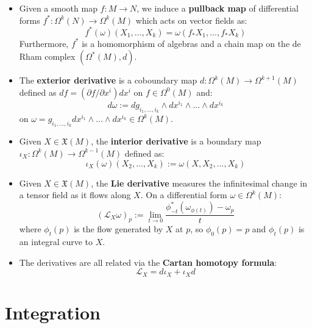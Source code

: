 \documentclass[11pt, oneside]{article}   	%
\theoremstyle{definition}
\begin{document}
\begin{itemize}
	\item Given a smooth map $f : M\rightarrow N$, we induce a \textbf{pullback map} of differential forms $f^* : \Omega^k(N)
	\rightarrow\Omega^k(M)$ which acts on vector fields as:
	\begin{equation}
		f^*(\omega)(X_1, ..., X_k) = \omega(f_* X_1, ..., f_* X_k)
	\end{equation}
	Furthermore, $f^*$ is a homomorphism of algebras and a chain map on the de Rham complex $(\Omega^*(M), d)$. 
	
	\item The \textbf{exterior derivative} is a coboundary map $d : \Omega^k(M)\rightarrow\Omega^{k + 1}(M)$ defined as 
	$df = (\partial f / \partial x^i)dx^i$ on $f\in\Omega^0(M)$ and:
	\begin{equation}
		d\omega := dg_{i_1, ..., i_k}\wedge dx^{i_1}\wedge ...\wedge 
		dx^{i_k}
	\end{equation}
	on $\omega = g_{i_1, ..., i_k} dx^{i_1}\wedge...\wedge dx^{i_k}\in\Omega^k(M)$. 
	
	\item Given $X\in\mathfrak X(M)$, the \textbf{interior derivative} is a boundary map $\iota_X : \Omega^k(M)
	\rightarrow\Omega^{k - 1}(M)$ defined as:
	\begin{equation}
		\iota_X(\omega)(X_2, ..., X_k) := \omega(X, X_2, ..., X_k)
	\end{equation}
	
	\item Given $X\in\mathfrak X(M)$, the \textbf{Lie derivative} measures the infinitesimal change in a tensor field as it 
	flows along $X$. On a differential form $\omega\in\Omega^k(M)$:
	\begin{equation}
		(\mathcal L_X\omega)_p := \lim_{t\rightarrow 0}\frac{\phi_{-t}^* (\omega_{\phi(t)}) - \omega_p}{t}
	\end{equation}
	where $\phi_t(p)$ is the flow generated by $X$ at $p$, so $\phi_0(p) = p$ and $\phi_t(p)$ is an integral curve to $X$. 
	
	\item The derivatives are all related via the \textbf{Cartan homotopy formula}:
	\begin{equation}
		\mathcal L_X = d\iota_X + \iota_X d
	\end{equation}
\end{itemize}

\newpage
\section{Integration}
\end{document}

